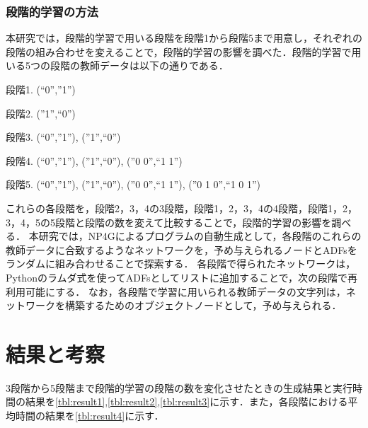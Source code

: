 \documentclass[exploratorypaper]{jsaiart} %
\begin{document}
\subsubsection{段階的学習の方法}
\label{sec:PLhow}
本研究では，段階的学習で用いる段階を段階1から段階5まで用意し，それぞれの段階の組み合わせを変えることで，段階的学習の影響を調べた．段階的学習で用いる5つの段階の教師データは以下の通りである．






段階1. (“0”,”1”)

段階2. (”1”,“0”)

段階3. (“0”,”1”), (”1”,“0”)

段階4. (“0”,”1”), (”1”,“0”), (”0 0”,“1 1”)

段階5. (“0”,”1”), (”1”,“0”), (”0 0”,“1 1”), (”0 1 0”,“1 0 1”)

これらの各段階を，段階2，3，4の3段階，段階1，2，3，4の4段階，段階1，2，3，4，5の5段階と段階の数を変えて比較することで，段階的学習の影響を調べる．
本研究では，NP4Gによるプログラムの自動生成として，各段階のこれらの教師データに合致するようなネットワークを，予め与えられるノードとADFsをランダムに組み合わせることで探索する．
各段階で得られたネットワークは，Pythonのラムダ式を使ってADFsとしてリストに追加することで，次の段階で再利用可能にする．
なお，各段階で学習に用いられる教師データの文字列は，ネットワークを構築するためのオブジェクトノードとして，予め与えられる．

\section{結果と考察}
3段階から5段階まで段階的学習の段階の数を変化させたときの生成結果と実行時間の結果を\ref{tbl:result1},\ref{tbl:result2},\ref{tbl:result3}に示す．また，各段階における平均時間の結果を\ref{tbl:result4}に示す．
\end{document}
